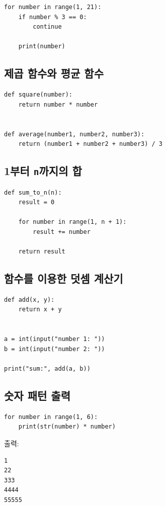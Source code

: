 \documentclass[11pt,a4paper]{article}
\begin{document}
\begin{lstlisting}
for number in range(1, 21):
    if number % 3 == 0:
        continue

    print(number)
\end{lstlisting}

\subsection{제곱 함수와 평균 함수}

\begin{lstlisting}
def square(number):
    return number * number


def average(number1, number2, number3):
    return (number1 + number2 + number3) / 3
\end{lstlisting}

\subsection{1부터 \texttt{n}까지의 합}

\begin{lstlisting}
def sum_to_n(n):
    result = 0

    for number in range(1, n + 1):
        result += number

    return result
\end{lstlisting}

\subsection{함수를 이용한 덧셈 계산기}

\begin{lstlisting}
def add(x, y):
    return x + y


a = int(input("number 1: "))
b = int(input("number 2: "))

print("sum:", add(a, b))
\end{lstlisting}

\subsection{숫자 패턴 출력}

\begin{lstlisting}
for number in range(1, 6):
    print(str(number) * number)
\end{lstlisting}

출력:

\begin{verbatim}
1
22
333
4444
55555
\end{verbatim}
\end{document}
